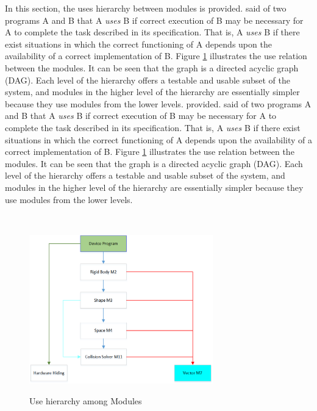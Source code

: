 \documentclass[12pt]{article}
\begin{document}
In this section, the uses hierarchy between modules is
provided. \citet{Parnas1978} said of two programs A and B that A {\em uses} B if correct execution of B may be necessary for A to complete the task described in its specification. That is, A {\em uses} B if there exist situations in which the correct functioning of A depends upon the availability of a correct implementation of B.  Figure \ref{Fig_uses} illustrates the use relation between the modules. It can be seen that the graph is a directed acyclic graph (DAG). Each level of the hierarchy offers a testable and usable subset of the system, and modules in the higher level of the hierarchy are essentially simpler because they use modules from the lower levels.
provided. \citet{Parnas1978} said of two programs A and B that A {\em uses} B if
correct execution of B may be necessary for A to complete the task described in
its specification. That is, A {\em uses} B if there exist situations in which
the correct functioning of A depends upon the availability of a correct
implementation of B.  Figure \ref{Fig_uses} illustrates the use relation between
the modules. It can be seen that the graph is a directed acyclic graph
(DAG). Each level of the hierarchy offers a testable and usable subset of the
system, and modules in the higher level of the hierarchy are essentially simpler
because they use modules from the lower levels. 

~\newpage
\begin{figure}[htbp]
\begin{center}
{
 \includegraphics[width=0.71\textwidth]{uses1}
}
\caption{\label{Fig_uses}Use hierarchy among Modules}
\end{center}
\end{figure}
\end{document}
